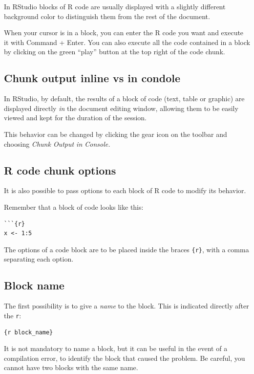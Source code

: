 \documentclass[
  letterpaper,
  DIV=11,
  numbers=noendperiod]{scrreprt}
\begin{document}
In RStudio blocks of R code are usually displayed with a slightly
different background color to distinguish them from the rest of the
document.

When your cursor is in a block, you can enter the R code you want and
execute it with Command + Enter. You can also execute all the code
contained in a block by clicking on the green ``play'' button at the top
right of the code chunk.

\subsection{Chunk output inline vs in
condole}\label{chunk-output-inline-vs-in-condole}

In RStudio, by default, the results of a block of code (text, table or
graphic) are displayed directly \emph{in} the document editing window,
allowing them to be easily viewed and kept for the duration of the
session.

This behavior can be changed by clicking the gear icon on the toolbar
and choosing \emph{Chunk Output in Console.}

\subsection{R code chunk options}\label{r-code-chunk-options}

It is also possible to pass options to each block of R code to modify
its behavior.

Remember that a block of code looks like this:

\begin{verbatim}
```{r}
x <- 1:5
\end{verbatim}

The options of a code block are to be placed inside the braces
\texttt{\{r\}}, with a comma separating each option.

\subsection{Block name}\label{block-name}

The first possibility is to give a \emph{name} to the block. This is
indicated directly after the \texttt{r}:

\texttt{\{r\ block\_name\}}

It is not mandatory to name a block, but it can be useful in the event
of a compilation error, to identify the block that caused the problem.
Be careful, you cannot have two blocks with the same name.
\end{document}
